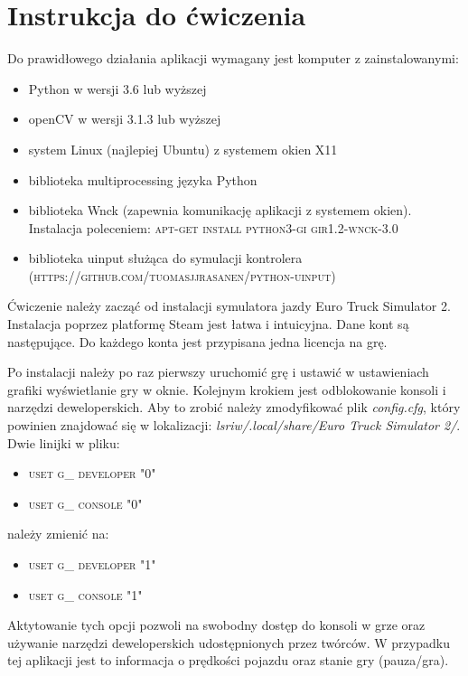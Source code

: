\chapter{Instrukcja do ćwiczenia}

Do prawidłowego działania aplikacji wymagany jest komputer z zainstalowanymi:
\begin{itemize}
\item Python w wersji 3.6 lub wyższej
\item openCV w wersji 3.1.3 lub wyższej
\item system Linux (najlepiej Ubuntu) z systemem okien X11
\item biblioteka multiprocessing języka Python
\item biblioteka Wnck (zapewnia komunikację aplikacji z systemem okien). Instalacja poleceniem: \textsc{apt-get install python3-gi gir1.2-wnck-3.0}
\item biblioteka uinput służąca do symulacji kontrolera (\textsc{https://github.com/tuomasjjrasanen/python-uinput})
\end{itemize}

Ćwiczenie należy zacząć od instalacji symulatora jazdy Euro Truck Simulator 2. Instalacja poprzez platformę Steam jest łatwa i intuicyjna. Dane kont są następujące. Do każdego konta jest przypisana jedna licencja na grę.

Po instalacji należy po raz pierwszy uruchomić grę i ustawić w ustawieniach grafiki wyświetlanie gry w oknie.
Kolejnym krokiem jest odblokowanie konsoli i narzędzi deweloperskich. Aby to zrobić należy zmodyfikować plik \textit{config.cfg}, który powinien znajdować się w lokalizacji: \textit{lsriw/.local/share/Euro Truck Simulator 2/}. Dwie linijki w pliku:
\begin{itemize}
\item \textsc{uset g\_ developer "0"}
\item \textsc{uset g\_ console "0"}
\end{itemize}

należy zmienić na:

\begin{itemize}
\item \textsc{uset g\_ developer "1"}
\item \textsc{uset g\_ console "1"}
\end{itemize}

Aktytowanie tych opcji pozwoli na swobodny dostęp do konsoli w grze oraz używanie narzędzi deweloperskich udostępnionych przez twórców. W przypadku tej aplikacji jest to informacja o prędkości pojazdu oraz stanie gry (pauza/gra).

